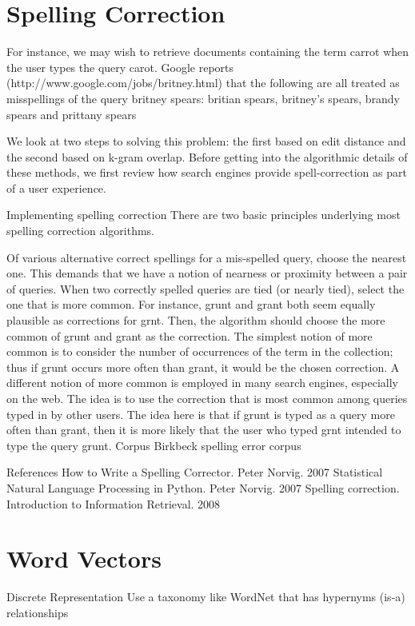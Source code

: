 \section{Spelling Correction}

For instance, we may wish to retrieve documents containing the term carrot when the user types the query carot. Google reports (http://www.google.com/jobs/britney.html) that the following are all treated as misspellings of the query britney spears: britian spears, britney’s spears, brandy spears and prittany spears

We look at two steps to solving this problem: the first based on edit distance and the second based on k-gram overlap. Before getting into the algorithmic details of these methods, we first review how search engines provide spell-correction as part of a user experience.

Implementing spelling correction
There are two basic principles underlying most spelling correction algorithms.

Of various alternative correct spellings for a mis-spelled query, choose the nearest one. This demands that we have a notion of nearness or proximity between a pair of queries.
When two correctly spelled queries are tied (or nearly tied), select the one that is more common. For instance, grunt and grant both seem equally plausible as corrections for grnt. Then, the algorithm should choose the more common of grunt and grant as the correction. The simplest notion of more common is to consider the number of occurrences of the term in the collection; thus if grunt occurs more often than grant, it would be the chosen correction. A different notion of more common is employed in many search engines, especially on the web. The idea is to use the correction that is most common among queries typed in by other users. The idea here is that if grunt is typed as a query more often than grant, then it is more likely that the user who typed grnt intended to type the query grunt.
Corpus
Birkbeck spelling error corpus

References
How to Write a Spelling Corrector. Peter Norvig. 2007
Statistical Natural Language Processing in Python. Peter Norvig. 2007
Spelling correction. Introduction to Information Retrieval. 2008

\section{Word Vectors}

Discrete Representation
Use a taxonomy like WordNet that has hypernyms (is-a) relationships

